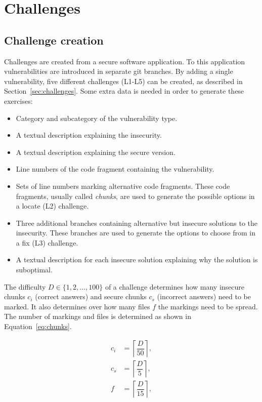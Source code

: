 \chapter{Challenges}
\label{app:challenges}

\section{Challenge creation}
\label{sec:challenge-creation}
Challenges are created from a secure software application. To this application vulnerabilities are introduced in separate git branches. By adding a single vulnerability, five different challenges (L1-L5) can be created, as described in Section~\ref{sec:challenges}. Some extra data is needed in order to generate these exercises:
\begin{itemize}
\setlength\itemsep{0em}
    \item Category and subcategory of the vulnerability type.
    \item A textual description explaining the insecurity.
    \item A textual description explaining the secure version.
    \item Line numbers of the code fragment containing the vulnerability.
    \item Sets of line numbers marking alternative code fragments. These code fragments, usually called \textit{chunks}, are used to generate the possible options in a locate (L2) challenge.
    \item Three additional branches containing alternative but insecure solutions to the insecurity. These branches are used to generate the options to choose from in a fix (L3) challenge.
    \item A textual description for each insecure solution explaining why the solution is suboptimal.
\end{itemize}

The difficulty $D \in \{1,2,\dots,100\}$ of a challenge determines how many insecure chunks $c_i$ (correct answers) and secure chunks $c_s$ (incorrect answers) need to be marked. It also determines over how many files $f$ the markings need to be spread. The number of markings and files is determined as shown in Equation~\ref{eq:chunks}.

\begin{subequations}
\label{eq:chunks}
\begin{align}
        c_i &= \left\lceil \dfrac{D}{50} \right\rceil ,         \label{eq:number-of-insecure-chunks} \\
        c_s &= \left\lceil \dfrac{D}{5} \right\rceil ,         \label{eq:number-of-secure-chunks} \\
        f &= \left\lceil \dfrac{D}{15} \right\rceil ,         \label{eq:number-of-files}
\end{align}
\end{subequations}

